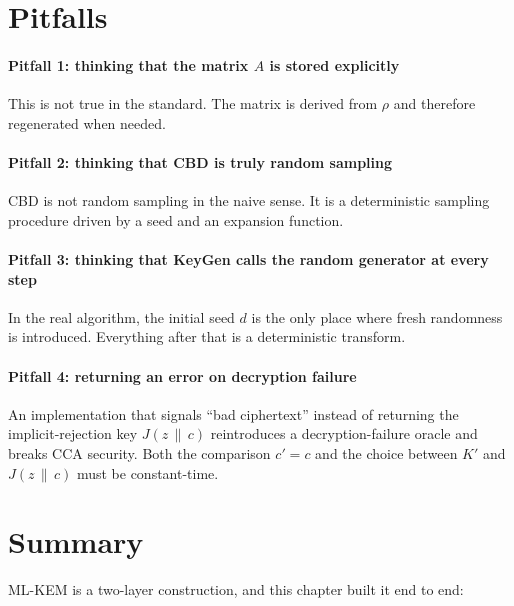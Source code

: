 \section{Pitfalls}

\paragraph{Pitfall 1: thinking that the matrix $A$ is stored explicitly}

This is not true in the standard. The matrix is derived from $\rho$ and therefore regenerated when needed.

\paragraph{Pitfall 2: thinking that CBD is truly random sampling}

CBD is not random sampling in the naive sense. It is a deterministic sampling procedure driven by a seed and an expansion function.

\paragraph{Pitfall 3: thinking that KeyGen calls the random generator at every step}

In the real algorithm, the initial seed $d$ is the only place where fresh randomness is introduced. Everything after that is a deterministic transform.

\paragraph{Pitfall 4: returning an error on decryption failure}

An implementation that signals ``bad ciphertext'' instead of returning the implicit-rejection key $J(z\,\|\,c)$ reintroduces a decryption-failure oracle and breaks CCA security. Both the comparison $c'=c$ and the choice between $K'$ and $J(z\,\|\,c)$ must be constant-time.

\section{Summary}

ML-KEM is a two-layer construction, and this chapter built it end to end:


